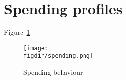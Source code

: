 
\section{Spending profiles}%
\label{sec:spending_profiles}

Figure~\ref{fig:spending}
\begin{figure}[H]
    \center \newcommand\width{\textwidth} \caption{Spending behaviour}
    \label{fig:spending}
    \texttt{[image: \\figdir/spending.png]}
\end{figure}



